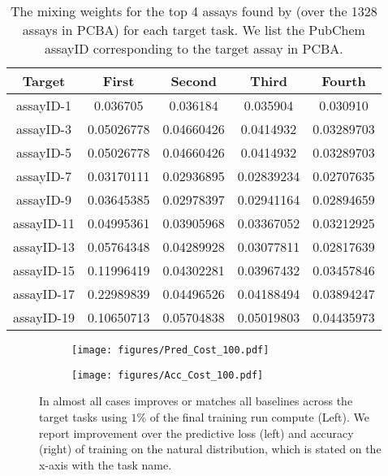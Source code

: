 \begin{table*}[h!]
    \centering
    \begin{tabular}{c | c c c c } 
     \toprule
     Target & First & Second & Third & Fourth \\
     \midrule
     assayID-1 & 0.036705 & 0.036184	& 0.035904 & 0.030910 \\
     assayID-3 & 0.05026778& 0.04660426& 0.0414932 & 0.03289703 \\
     assayID-5 & 0.05026778& 0.04660426& 0.0414932 & 0.03289703 \\
     assayID-7 & 0.03170111& 0.02936895& 0.02839234& 0.02707635 \\
     assayID-9 & 0.03645385& 0.02978397& 0.02941164& 0.02894659 \\
     assayID-11 & 0.04995361& 0.03905968& 0.03367052& 0.03212925 \\
     assayID-13 & 0.05764348& 0.04289928& 0.03077811& 0.02817639 \\
     assayID-15 & 0.11996419& 0.04302281& 0.03967432& 0.03457846 \\
     assayID-17 & 0.22989839& 0.04496526& 0.04188494& 0.03894247 \\
     assayID-19 & 0.10650713& 0.05704838& 0.05019803& 0.04435973\\
     \bottomrule
    \end{tabular}
    \caption{The mixing weights for the top 4 assays found by \method (over the 1328 assays in PCBA) for each target task. We list the PubChem assayID corresponding to the target assay in PCBA. }
    \label{tab:chem_assay_sel}
\end{table*}








\begin{figure*}[t!]
\centering
\begin{subfigure}
    \centering
    \texttt{[image: figures/Pred\_Cost\_100.pdf]}
    \label{fig:pred_loss_100}
\end{subfigure}%
\begin{subfigure}
    \centering
    \texttt{[image: figures/Acc\_Cost\_100.pdf]}
    \label{fig:acc_100}
\end{subfigure}
\caption{In almost all cases \method improves or matches all baselines across the target tasks using $1\%$ of the final training run compute (Left). We report improvement over the predictive loss (left) and accuracy (right) of training on the natural distribution, which is stated on the x-axis with the task name.}
\label{fig:cost_100_res}
\end{figure*}

